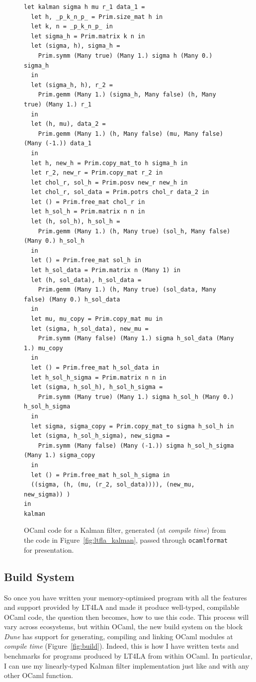 \begin{figure}[p]
    \begin{verbatim}
let kalman sigma h mu r_1 data_1 =
  let h, _p_k_n_p_ = Prim.size_mat h in
  let k, n = _p_k_n_p_ in
  let sigma_h = Prim.matrix k n in
  let (sigma, h), sigma_h =
    Prim.symm (Many true) (Many 1.) sigma h (Many 0.) sigma_h
  in
  let (sigma_h, h), r_2 =
    Prim.gemm (Many 1.) (sigma_h, Many false) (h, Many true) (Many 1.) r_1
  in
  let (h, mu), data_2 =
    Prim.gemm (Many 1.) (h, Many false) (mu, Many false) (Many (-1.)) data_1
  in
  let h, new_h = Prim.copy_mat_to h sigma_h in
  let r_2, new_r = Prim.copy_mat r_2 in
  let chol_r, sol_h = Prim.posv new_r new_h in
  let chol_r, sol_data = Prim.potrs chol_r data_2 in
  let () = Prim.free_mat chol_r in
  let h_sol_h = Prim.matrix n n in
  let (h, sol_h), h_sol_h =
    Prim.gemm (Many 1.) (h, Many true) (sol_h, Many false) (Many 0.) h_sol_h
  in
  let () = Prim.free_mat sol_h in
  let h_sol_data = Prim.matrix n (Many 1) in
  let (h, sol_data), h_sol_data =
    Prim.gemm (Many 1.) (h, Many true) (sol_data, Many false) (Many 0.) h_sol_data
  in
  let mu, mu_copy = Prim.copy_mat mu in
  let (sigma, h_sol_data), new_mu =
    Prim.symm (Many false) (Many 1.) sigma h_sol_data (Many 1.) mu_copy
  in
  let () = Prim.free_mat h_sol_data in
  let h_sol_h_sigma = Prim.matrix n n in
  let (sigma, h_sol_h), h_sol_h_sigma =
    Prim.symm (Many true) (Many 1.) sigma h_sol_h (Many 0.) h_sol_h_sigma
  in
  let sigma, sigma_copy = Prim.copy_mat_to sigma h_sol_h in
  let (sigma, h_sol_h_sigma), new_sigma =
    Prim.symm (Many false) (Many (-1.)) sigma h_sol_h_sigma (Many 1.) sigma_copy
  in
  let () = Prim.free_mat h_sol_h_sigma in
  ((sigma, (h, (mu, (r_2, sol_data)))), (new_mu, new_sigma)) )
in
kalman
    \end{verbatim}
    \caption{OCaml code for a Kalman filter, generated (at \emph{compile time})
        from the code in Figure~\ref{fig:ltfla_kalman}, passed through
        \texttt{ocamlformat} for presentation.}\label{fig:ocaml_kalman}

\end{figure}

\subsection{Build System}

So once you have written your memory-optimised program with all the features
and support provided by LT4LA and made it produce well-typed, compilable OCaml
code, the question then becomes, how to use this code. This process will vary
across ecosystems, but within OCaml, the new build system on the block
\emph{Dune} has support for generating, compiling and linking OCaml modules at
\emph{compile time} (Figure~\ref{fig:build}). Indeed, this is how I have written
tests and benchmarks for programs produced by LT4LA from within OCaml. In
particular, I can use my linearly-typed Kalman filter implementation just like
and with any other OCaml function.

